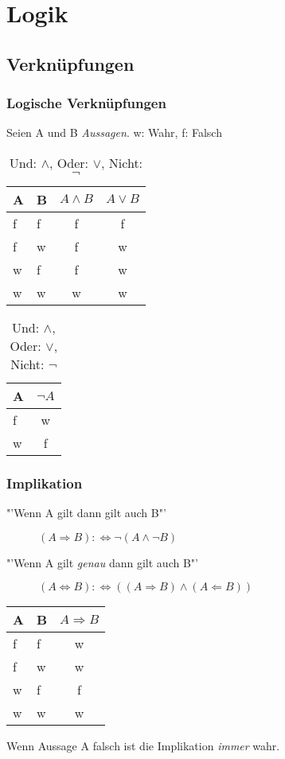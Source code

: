 \section{Logik}
\subsection{Verknüpfungen}
\begin{frame}
  \frametitle{Logische Verknüpfungen}
  \begin{definition}
    Seien A und B \emph{Aussagen}. w: Wahr, f: Falsch
    
  	\begin{table}
    	\begin{tabular}{|l|l||c||c|}
    	\hline
    	A & B & $ A \wedge B$ & $A \vee B$\\
      \hline
	      f & f & f & f \\
	      f & w & f & w \\
	      w & f & f & w \\
	      w & w & w & w \\
      \hline
      \end{tabular}
    	\begin{tabular}{|l||c|}
    	\hline
    	A & $\neg A$\\
      \hline
	      f & w\\
	      w & f\\
      \hline

      \end{tabular}
       \caption{Und: $\wedge$, Oder: $\vee$, Nicht: $\neg$}
    \end{table}
  \end{definition}
\end{frame}
\begin{frame}
  \frametitle{Implikation}
  \begin{definition}
    \begin{description}
    \item["'Wenn A gilt dann gilt auch B"'] $(A \Rightarrow B) :\Leftrightarrow \neg (A \wedge \neg B)$
    \item["'Wenn A gilt \emph{genau} dann gilt auch B"']$(A \Leftrightarrow B) :\Leftrightarrow ((A \Rightarrow B) \wedge (A \Leftarrow B))$
    \end{description}
  	\begin{table}
    	\begin{tabular}{|l|l||c|}
    	\hline
    	A & B & $ A \Rightarrow B$\\
      \hline
	      f & f & w \\
	      f & w & w \\
	      w & f & f \\
	      w & w & w \\
      \hline
      \end{tabular}
    \end{table}
  \end{definition}
  \begin{alertblock}{}
    Wenn Aussage A falsch ist die Implikation \emph{immer} wahr.
  \end{alertblock}
\end{frame}

